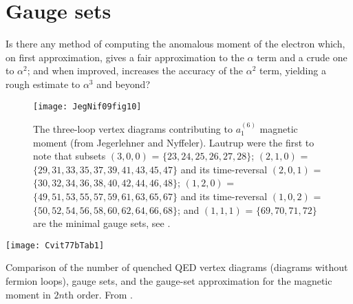 \section{Gauge sets}
\label{sect:finitness}

\begin{bartlett}{
Is there any method of computing the anomalous moment of the
electron which, on first approximation, gives a fair approximation to the
$\alpha$ term and a crude one to $\alpha^2$; and when improved, increases
the accuracy of the $\alpha^2$ term, yielding a rough estimate to
$\alpha^3$ and beyond?
        }
\end{bartlett}

\bigskip

\begin{figure}
\begin{center}
\texttt{[image: JegNif09fig10]}
\end{center}
\caption{\label{JegNif09fig10}
The three-loop vertex diagrams contributing to $a^{(6)}_1$
magnetic moment
(from Jegerlehner and Nyffeler).
Lautrup \etal{} were the first to note that
subsets
$(3,0,0)$ = $\{23,24,25,26,27,28\}$;
$(2,1,0)$ = $\{29,31,33,35,37,39,41,43,45,47\}$ and its time-reversal
$(2,0,1)$ = $\{30,32,34,36,38,40,42,44,46,48\}$;
$(1,2,0)$ = $\{49,51,53,55,57,59,61,63,65,67\}$ and its time-reversal
$(1,0,2)$ = $\{50,52,54,56,58,60,62,64,66,68\}$;
and
$(1,1,1)$ = $\{69,70,71,72\}$
are the minimal gauge sets, see .
}
 \end{figure}

\begin{table}
\begin{center}
\texttt{[image: Cvit77bTab1]}
\end{center}
\caption{\label{Cvit77bTab1}
Comparison of the number of quenched QED vertex diagrams
(diagrams without fermion loops), gauge
sets, and the gauge-set approximation  for the magnetic
moment in $2n$th order.
From .
}
\end{table}

